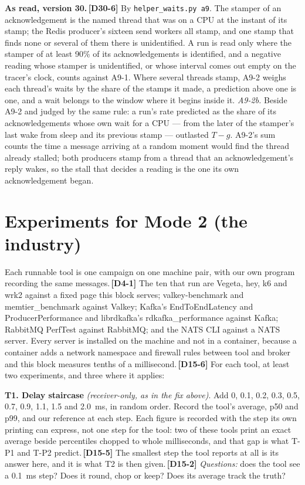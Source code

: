 \documentclass[11pt]{article}
\newcommand{\gl}[1]{{\color{soft}\itshape\small (#1)}}
\newcommand{\chg}[1]{\,{\color{chgcol}\bfseries\footnotesize[#1]}}
\newcommand{\chgold}[1]{\,{\color{oldcol}\bfseries\footnotesize[#1]}}
\begin{document}
\textbf{As read, version 30.}\chg{D30-6} By \texttt{helper\_waits.py a9}. The stamper of an acknowledgement is the named thread that was on a CPU at the instant of its stamp; the Redis producer's sixteen send workers all stamp, and one stamp that finds none or several of them there is unidentified. A run is read only where the stamper of at least 90\% of its acknowledgements is identified, and a negative reading whose stamper is unidentified, or whose interval comes out empty on the tracer's clock, counts against A9-1. Where several threads stamp, A9-2 weighs each thread's waits by the share of the stamps it made, a prediction above one is one, and a wait belongs to the window where it begins inside it. \emph{A9-2b.} Beside A9-2 and judged by the same rule: a run's rate predicted as the share of its acknowledgements whose own wait for a CPU --- from the later of the stamper's last wake from sleep and its previous stamp --- outlasted $T - g$. A9-2's sum counts the time a message arriving at a random moment would find the thread already stalled; both producers stamp from a thread that an acknowledgement's reply wakes, so the stall that decides a reading is the one its own acknowledgement began.

\section{Experiments for Mode 2 (the industry)}

Each runnable tool is one campaign on one machine pair, with our own program recording the same messages.\chgold{D4-1} The ten that run are Vegeta, hey, k6 and wrk2 against a fixed page this block serves; valkey-benchmark and memtier\_benchmark against Valkey; Kafka's EndToEndLatency and ProducerPerformance and librdkafka's rdkafka\_performance against Kafka; RabbitMQ PerfTest against RabbitMQ; and the NATS CLI against a NATS server. Every server is installed on the machine and not in a container, because a container adds a network namespace and firewall rules between tool and broker and this block measures tenths of a millisecond.\chgold{D15-6} For each tool, at least two experiments, and three where it applies:

\textbf{T1. Delay staircase} \gl{receiver-only, as in the fix above}. Add 0, 0.1, 0.2, 0.3, 0.5, 0.7, 0.9, 1.1, 1.5 and 2.0~ms, in random order. Record the tool's average, p50 and p99, and our reference at each step. Each figure is recorded with the step its own printing can express, not one step for the tool: two of these tools print an exact average beside percentiles chopped to whole milliseconds, and that gap is what T-P1 and T-P2 predict.\chgold{D15-5} The smallest step the tool reports at all is its answer here, and it is what T2 is then given.\chgold{D15-2} \emph{Questions:} does the tool see a 0.1~ms step? Does it round, chop or keep? Does its average track the truth?
\end{document}
